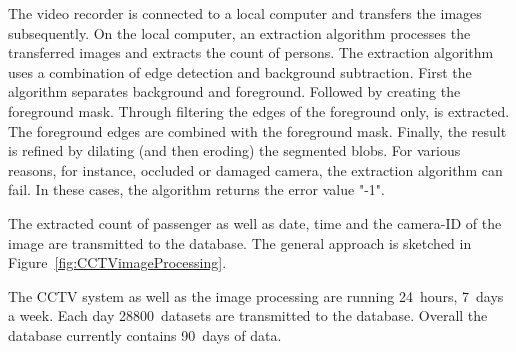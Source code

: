 The video recorder is connected to a local computer and transfers the images subsequently. 
On the local computer, an extraction algorithm processes the transferred images and extracts the count of persons.
The extraction algorithm uses a combination of edge detection and background subtraction. 
First the algorithm separates background and foreground. 
Followed by creating the foreground mask.
Through filtering the edges of the foreground only, is extracted. 
The foreground edges are combined with the foreground mask. 
Finally, the result is refined by dilating (and then eroding) the segmented blobs.
For various reasons, for instance, occluded or damaged camera, the extraction algorithm can fail. 
In these cases, the algorithm returns the error value "-1".

The extracted count of passenger as well as date, time and the camera-ID of the image are transmitted to the database. 
The general approach is sketched in Figure~\ref{fig:CCTVimageProcessing}.


The CCTV system as well as the image processing are running 24~hours, 7~days a week. 
Each day 28800~datasets are transmitted to the database. 
Overall the database currently contains 90~days of data. 
